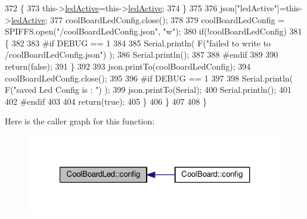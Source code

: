 \begin{DoxyCode}
372             \{
373                 this->\hyperlink{class_cool_board_led_aadd04d2ecf123247718d77f42fba7f08}{ledActive}=this->\hyperlink{class_cool_board_led_aadd04d2ecf123247718d77f42fba7f08}{ledActive};          
374             \}
375             
376             json[\textcolor{stringliteral}{"ledActive"}]=this->\hyperlink{class_cool_board_led_aadd04d2ecf123247718d77f42fba7f08}{ledActive};
377             coolBoardLedConfig.close();
378             
379             coolBoardLedConfig = SPIFFS.open(\textcolor{stringliteral}{"/coolBoardLedConfig.json"}, \textcolor{stringliteral}{"w"});
380             \textcolor{keywordflow}{if}(!coolBoardLedConfig)
381             \{
382             
383 \textcolor{preprocessor}{            #if DEBUG == 1 }
384 
385                 Serial.println( F(\textcolor{stringliteral}{"failed to write to /coolBoardLedConfig.json"}) );
386                 Serial.println();
387 
388 \textcolor{preprocessor}{            #endif}
389 
390                 \textcolor{keywordflow}{return}(\textcolor{keyword}{false});          
391             \}
392 
393             json.printTo(coolBoardLedConfig);
394             coolBoardLedConfig.close();
395 
396 \textcolor{preprocessor}{        #if DEBUG == 1}
397     
398             Serial.println( F(\textcolor{stringliteral}{"saved Led Config is : "}) );
399             json.printTo(Serial);
400             Serial.println();
401 
402 \textcolor{preprocessor}{        #endif}
403 
404             \textcolor{keywordflow}{return}(\textcolor{keyword}{true}); 
405         \}
406     \}   
407 
408 \}               
\end{DoxyCode}
Here is the caller graph for this function\+:\nopagebreak
\begin{figure}[H]
\begin{center}
\leavevmode
\includegraphics[width=321pt]{de/dc0/class_cool_board_led_a1b60e5e30bea96c49ed62ed1bf1ffc8b_icgraph}
\end{center}
\end{figure}
\mbox{\label{class_cool_board_led_a69f323359e0c9f797422f2152b5d41ef}} 
